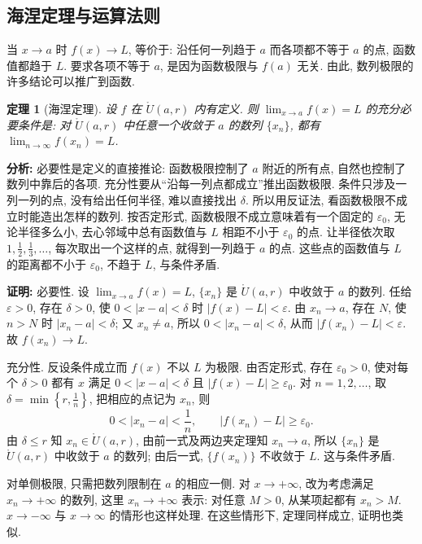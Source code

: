 \documentclass[UTF8,openany]{ctexbook}
\theoremstyle{chinesetextbook}
\newtheorem{theorem}{定理}[section]
\newenvironment{cnproof}{\par\indent\textbf{证明:} \ignorespaces}{\par}
\begin{document}
\subsection{海涅定理与运算法则}
当 $x\to a$ 时 $f(x)\to L$, 等价于: 沿任何一列趋于 $a$ 而各项都不等于 $a$ 的点, 函数值都趋于 $L$. 要求各项不等于 $a$, 是因为函数极限与 $f(a)$ 无关. 由此, 数列极限的许多结论可以推广到函数.
\begin{theorem}[海涅定理]
设 $f$ 在 $\mathring U(a,r)$ 内有定义. 则 $\displaystyle\lim_{x\to a}f(x)=L$ 的充分必要条件是: 对 $\mathring U(a,r)$ 中任意一个收敛于 $a$ 的数列 $\{x_n\}$, 都有 $\displaystyle\lim_{n\to\infty}f(x_n)=L$.
\end{theorem}
\par\indent\textbf{分析:} 必要性是定义的直接推论: 函数极限控制了 $a$ 附近的所有点, 自然也控制了数列中靠后的各项. 充分性要从“沿每一列点都成立”推出函数极限. 条件只涉及一列一列的点, 没有给出任何半径, 难以直接找出 $\delta$. 所以用反证法, 看函数极限不成立时能造出怎样的数列. 按否定形式, 函数极限不成立意味着有一个固定的 $\varepsilon_0$, 无论半径多么小, 去心邻域中总有函数值与 $L$ 相距不小于 $\varepsilon_0$ 的点. 让半径依次取 $\displaystyle1,\frac12,\frac13,\ldots$, 每次取出一个这样的点, 就得到一列趋于 $a$ 的点. 这些点的函数值与 $L$ 的距离都不小于 $\varepsilon_0$, 不趋于 $L$, 与条件矛盾.
\begin{cnproof}
必要性. 设 $\displaystyle\lim_{x\to a}f(x)=L$, $\{x_n\}$ 是 $\mathring U(a,r)$ 中收敛于 $a$ 的数列. 任给 $\varepsilon>0$, 存在 $\delta>0$, 使 $0<|x-a|<\delta$ 时 $|f(x)-L|<\varepsilon$. 由 $x_n\to a$, 存在 $N$, 使 $n>N$ 时 $|x_n-a|<\delta$; 又 $x_n\ne a$, 所以 $0<|x_n-a|<\delta$, 从而 $|f(x_n)-L|<\varepsilon$. 故 $f(x_n)\to L$.

充分性. 反设条件成立而 $f(x)$ 不以 $L$ 为极限. 由否定形式, 存在 $\varepsilon_0>0$, 使对每个 $\delta>0$ 都有 $x$ 满足 $0<|x-a|<\delta$ 且 $|f(x)-L|\ge\varepsilon_0$. 对 $n=1,2,\ldots$, 取 $\displaystyle\delta=\min\left\{r,\frac1n\right\}$, 把相应的点记为 $x_n$, 则
\[
0<|x_n-a|<\frac1n,\qquad|f(x_n)-L|\ge\varepsilon_0.
\]
由 $\delta\le r$ 知 $x_n\in\mathring U(a,r)$, 由前一式及两边夹定理知 $x_n\to a$, 所以 $\{x_n\}$ 是 $\mathring U(a,r)$ 中收敛于 $a$ 的数列; 由后一式, $\{f(x_n)\}$ 不收敛于 $L$. 这与条件矛盾.
\end{cnproof}
对单侧极限, 只需把数列限制在 $a$ 的相应一侧. 对 $x\to+\infty$, 改为考虑满足 $x_n\to+\infty$ 的数列, 这里 $x_n\to+\infty$ 表示: 对任意 $M>0$, 从某项起都有 $x_n>M$. $x\to-\infty$ 与 $x\to\infty$ 的情形也这样处理. 在这些情形下, 定理同样成立, 证明也类似.
\end{document}
